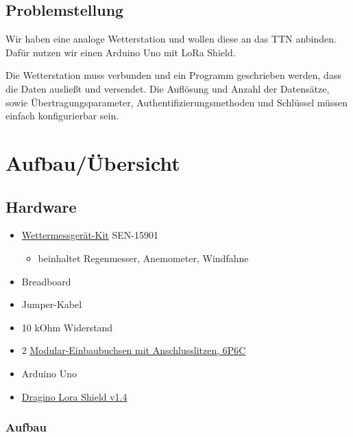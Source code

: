 \documentclass[12pt]{article}
\begin{document}
    \subsection{Problemstellung} \label{subsec:Problemstellung}
        Wir haben eine analoge Wetterstation und wollen diese an das TTN anbinden.
        Dafür nutzen wir einen Arduino Uno mit LoRa Shield.

        Die Wetterstation muss verbunden und ein Programm geschrieben werden, dass die Daten ausließt und versendet.
        Die Auflösung und Anzahl der Datensätze, sowie Übertragungsparameter, Authentifizierungsmethoden und Schlüssel
        müssen einfach konfigurierbar sein.



  \section{Aufbau/Übersicht}

    \subsection{Hardware}

      \begin{itemize}
        \item\href{https://learn.sparkfun.com/tutorials/weather-meter-hookup-guide#resources-and-going-further}{Wettermessgerät-Kit} SEN-15901
        
        \begin{itemize}
          \item beinhaltet Regenmesser, Anemometer, Windfahne
        \end{itemize}

        \item Breadboard
        \item Jumper-Kabel
        \item 10 kOhm Widerstand
        \item 2 \href{https://www.pollin.de/p/modular-einbaubuchse-mit-anschlusslitzen-6p6c-541843}{Modular-Einbaubuchsen mit Anschlusslitzen, 6P6C}
        \item Arduino Uno
        \item \href{https://wiki.dragino.com/index.php?title=Lora_Shield}{Dragino Lora Shield v1.4}
      \end{itemize}

      \subsubsection{Aufbau}
\end{document}
